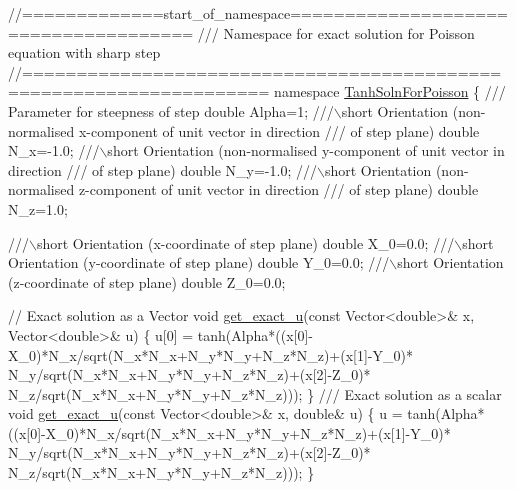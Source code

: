  
\begin{DoxyCodeInclude}
\textcolor{comment}{//=============start\_of\_namespace=====================================}
\textcolor{comment}{/// Namespace for exact solution for Poisson equation with sharp step }
\textcolor{comment}{}\textcolor{comment}{//====================================================================}
\textcolor{keyword}{namespace }\hyperlink{namespaceTanhSolnForPoisson}{TanhSolnForPoisson}
\{
\textcolor{comment}{}
\textcolor{comment}{ /// Parameter for steepness of step}
\textcolor{comment}{} \textcolor{keywordtype}{double} Alpha=1;
\textcolor{comment}{}
\textcolor{comment}{ ///\(\backslash\)short Orientation (non-normalised x-component of unit vector in direction}
\textcolor{comment}{ /// of step plane)}
\textcolor{comment}{} \textcolor{keywordtype}{double} N\_x=-1.0;
\textcolor{comment}{}
\textcolor{comment}{ ///\(\backslash\)short Orientation (non-normalised y-component of unit vector in direction}
\textcolor{comment}{ /// of step plane)}
\textcolor{comment}{} \textcolor{keywordtype}{double} N\_y=-1.0;
\textcolor{comment}{}
\textcolor{comment}{ ///\(\backslash\)short Orientation (non-normalised z-component of unit vector in direction}
\textcolor{comment}{ /// of step plane)}
\textcolor{comment}{} \textcolor{keywordtype}{double} N\_z=1.0;

\textcolor{comment}{}
\textcolor{comment}{ ///\(\backslash\)short Orientation (x-coordinate of step plane) }
\textcolor{comment}{} \textcolor{keywordtype}{double} X\_0=0.0;
\textcolor{comment}{}
\textcolor{comment}{ ///\(\backslash\)short Orientation (y-coordinate of step plane) }
\textcolor{comment}{} \textcolor{keywordtype}{double} Y\_0=0.0;
\textcolor{comment}{}
\textcolor{comment}{ ///\(\backslash\)short Orientation (z-coordinate of step plane) }
\textcolor{comment}{} \textcolor{keywordtype}{double} Z\_0=0.0;


 \textcolor{comment}{// Exact solution as a Vector}
 \textcolor{keywordtype}{void} \hyperlink{namespaceTanhSolnForPoisson_af7896e9c18ce6438c73ae2a875e8b7de}{get\_exact\_u}(\textcolor{keyword}{const} Vector<double>& x, Vector<double>& u)
 \{
  u[0] = tanh(Alpha*((x[0]-X\_0)*N\_x/sqrt(N\_x*N\_x+N\_y*N\_y+N\_z*N\_z)+(x[1]-Y\_0)*
                     N\_y/sqrt(N\_x*N\_x+N\_y*N\_y+N\_z*N\_z)+(x[2]-Z\_0)*
                     N\_z/sqrt(N\_x*N\_x+N\_y*N\_y+N\_z*N\_z)));
 \}
\textcolor{comment}{}
\textcolor{comment}{ /// Exact solution as a scalar}
\textcolor{comment}{} \textcolor{keywordtype}{void} \hyperlink{namespaceTanhSolnForPoisson_af7896e9c18ce6438c73ae2a875e8b7de}{get\_exact\_u}(\textcolor{keyword}{const} Vector<double>& x, \textcolor{keywordtype}{double}& u)
 \{
  u = tanh(Alpha*((x[0]-X\_0)*N\_x/sqrt(N\_x*N\_x+N\_y*N\_y+N\_z*N\_z)+(x[1]-Y\_0)*
                     N\_y/sqrt(N\_x*N\_x+N\_y*N\_y+N\_z*N\_z)+(x[2]-Z\_0)*
                     N\_z/sqrt(N\_x*N\_x+N\_y*N\_y+N\_z*N\_z)));
 \}


\end{DoxyCodeInclude}
